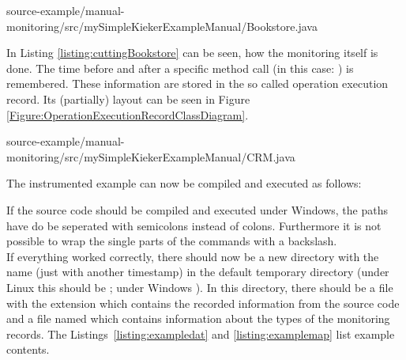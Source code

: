 \setJavaCodeListing
%
{source-example/manual-monitoring/src/mySimpleKiekerExampleManual/Bookstore.java}
		
In Listing \ref{listing:cuttingBookstore}  can be seen, how the monitoring itself is done. The time before and after a specific method call (in this case: ) is remembered. These information are stored in the so called operation execution record. Its (partially) layout can be seen in Figure \ref{Figure:OperationExecutionRecordClassDiagram}.

\setJavaCodeListing
%
{source-example/manual-monitoring/src/mySimpleKiekerExampleManual/CRM.java}

The instrumented example can now be compiled and executed as follows:

\setBashListing 		
			

\warning If the source code should be compiled and executed under Windows, the %
paths have do be seperated with semicolons instead of colons. Furthermore it is %
not possible to wrap the single parts of the commands with a backslash.\\
If everything worked correctly, there should now be a new directory with the %
name  (just with another timestamp) in the default %
temporary directory (under Linux this should be ; under Windows %
). In this directory, there should be a file with the extension %
 which contains the recorded information from the source code and %
a file named  which contains information about the types of the %
monitoring records. %
The Listings~\ref{listing:exampledat} and \ref{listing:examplemap} list example %
contents. 

